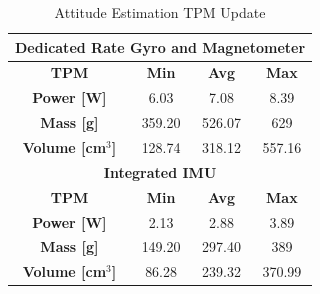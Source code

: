 \documentclass[conf]{new-aiaa}
\begin{document}


\begin{table}[H]
 \centering
 \caption{Attitude Estimation TPM Update}
\begin{tabular}{ |c|c|c|c|  }
 \hline
 \multicolumn{4}{|c|}{\textbf{Dedicated Rate Gyro and Magnetometer}} \\
 \hline
 \textbf{TPM} & \textbf{Min} & \textbf{Avg} & \textbf{Max} \\
 \hline
 \textbf{Power [W]} & 6.03 & 7.08 & 8.39 \\
 \hline
 \textbf{Mass [g]} & 359.20 & 526.07 & 629 \\
 \hline
 \textbf{Volume [cm$^3$]} & 128.74 & 318.12 & 557.16 \\
 \hline
 \multicolumn{4}{|c|}{\textbf{Integrated IMU}} \\
 \hline
 \textbf{TPM} & \textbf{Min} & \textbf{Avg} & \textbf{Max} \\
 \hline
  \textbf{Power [W]} & 2.13 & 2.88 & 3.89 \\
 \hline
 \textbf{Mass [g]} & 149.20 & 297.40 & 389 \\
\hline
 \textbf{Volume [cm$^3$]} & 86.28 & 239.32 & 370.99\\
 \hline
\end{tabular}
\label{t:TPM_Update2}
\end{table}
\end{document}
